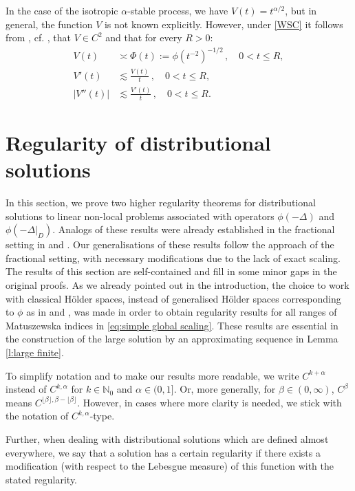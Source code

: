 \documentclass[12pt,a4paper,onecolumn]{amsart}
\theoremstyle{definition}
\newcommand{\N}{\mathbb{N}}
\newcommand{\1}{\mathbf 1}
\newcommand{\Lo}{\phi(-\left.\Delta\right\vert_{D})}
\newcommand{\LoR}{\phi(-\Delta)}
\numberwithin{equation}{section}
\begin{document}
In the case of the isotropic $\alpha$-stable process, we have $V(t)=t^{\alpha/2}$, but in general, the function $V$ is not known explicitly. However, under \ref{WSC} it follows from \cite[Lemma 2.4, Lemma 2.5]{KKLL}, cf. \cite{ksv_twosided}, that $V\in C^2$ and that for every $R>0$:
\begin{align}
V(t) &\asymp \Phi(t):=\phi(t^{ -2})^{-1/2}\, ,\quad 0<t\leq R,\label{e:V-phi}\\
V'(t)&\lesssim\frac{V(t)}{t}\, ,\quad 0<t\leq R,\label{eq:H1}\\
|V''(t)|&\lesssim\frac{V'(t)}{t}\, ,\quad 0<t\leq R.\label{eq:H2}
\end{align}




\section{Regularity of distributional solutions}\label{s:regularity}
In this section, we prove two higher regularity theorems for distributional solutions to linear non-local problems associated with operators $\LoR$ and $\Lo$. Analogs of these results were already established in the fractional setting in \cite{Silvestre2007regularity} and \cite{AbaDupaNonhomo2017}. Our generalisations of these results follow the approach of the fractional setting, with necessary modifications due to the lack of exact scaling. The results of this section are self-contained and fill in some minor gaps in the original proofs. As we already pointed out in the introduction, the choice to work with classical H\"older spaces, instead of generalised H\"older spaces corresponding to $\phi$ as in \cite{BaeKassmann} and \cite{KimLee}, was made in order to obtain regularity results for all ranges of Matuszewska indices in \eqref{eq:simple global scaling}. These results are essential in the construction of the large solution by an approximating sequence in Lemma \ref{l:large finite}.  

To simplify notation and to make our results more readable, we write $C^{k+\alpha}$ instead of $C^{k,\alpha}$ for $k\in \N_0$ and $\alpha\in(0,1]$. Or, more generally, for $\beta\in (0,\infty)$, $C^\beta$ means $C^{\lfloor \beta \rfloor, \beta -\lfloor \beta \rfloor}$. However, in cases where more clarity is needed, we stick with the notation of $C^{k,\alpha}$-type.

Further, when dealing with distributional solutions which are defined almost everywhere, we say that a solution has a certain regularity if there exists a modification (with respect to the Lebesgue measure) of this function with the stated regularity.
\end{document}
